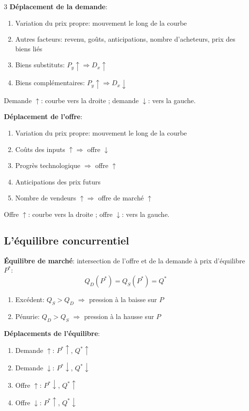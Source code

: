 \documentclass[12pt, a4paper]{article}
\begin{document}
\begin{multicols*}{3}
\textbf{Déplacement de la demande}:
\begin{enumerate}[\roman*.]
  \item Variation du prix propre: mouvement le long de la courbe
  \item Autres facteurs: revenu, goûts, anticipations, nombre d'acheteurs, prix des biens liés
  \item Biens substituts: $P_y\uparrow\Rightarrow D_x\uparrow$
  \item Biens complémentaires: $P_y\uparrow\Rightarrow D_x\downarrow$
\end{enumerate}
Demande $\uparrow$: courbe vers la droite ; demande $\downarrow$: vers la gauche.

\textbf{Déplacement de l'offre}:
\begin{enumerate}[\roman*.]
  \item Variation du prix propre: mouvement le long de la courbe
  \item Coûts des inputs $\uparrow\Rightarrow$ offre $\downarrow$
  \item Progrès technologique $\Rightarrow$ offre $\uparrow$
  \item Anticipations des prix futurs
  \item Nombre de vendeurs $\uparrow\Rightarrow$ offre de marché $\uparrow$
\end{enumerate}
Offre $\uparrow$: courbe vers la droite ; offre $\downarrow$: vers la gauche.

\subsection{L'équilibre concurrentiel}

\textbf{Équilibre de marché}: intersection de l'offre et de la demande à prix d'équilibre $P^*$:
\[
\boxed{Q_D(P^*)=Q_S(P^*)=Q^*}
\]
\begin{enumerate}[\roman*.]
  \item Excédent: $Q_S>Q_D$ $\Rightarrow$ pression à la baisse sur $P$
  \item Pénurie: $Q_D>Q_S$ $\Rightarrow$ pression à la hausse sur $P$
\end{enumerate}

\textbf{Déplacements de l'équilibre}:
\begin{enumerate}[\roman*.]
  \item Demande $\uparrow$: $P^*\uparrow$, $Q^*\uparrow$
  \item Demande $\downarrow$: $P^*\downarrow$, $Q^*\downarrow$
  \item Offre $\uparrow$: $P^*\downarrow$, $Q^*\uparrow$
  \item Offre $\downarrow$: $P^*\uparrow$, $Q^*\downarrow$
\end{enumerate}


\end{multicols*}
\end{document}
